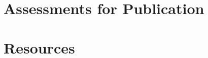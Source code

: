\documentclass{book}
\begin{document}



\appendix

\chapter{Assessments for Publication}
  \clearpage %
  \clearpage  %

\chapter{Resources}
  

 \clearpage%

\newif\ifbooknotes

\booknotesfalse

\ifbooknotes
\chapter{Book notes}
\clearpage
\clearpage
\clearpage
\clearpage
\clearpage
\clearpage
\clearpage
\clearpage


\else

\fi

\clearpage

\printglossaries

\nocite{*} %
\end{document}
